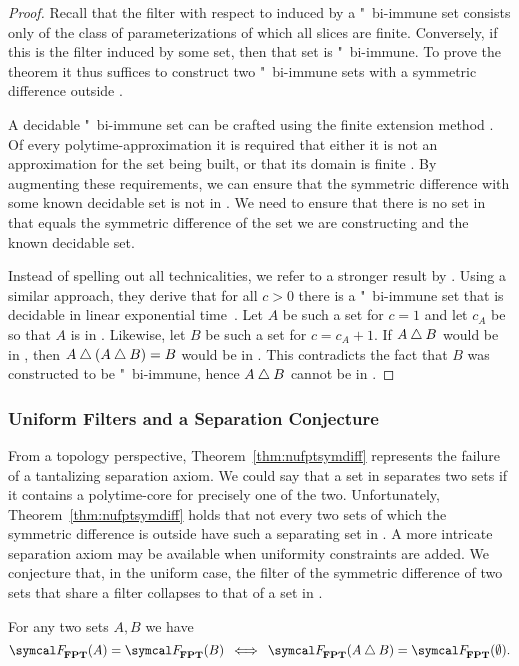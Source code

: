 \begin{proof}
  Recall that the filter with respect to  induced by a "~bi-immune set consists only of the class of parameterizations of which all slices are finite.
  Conversely, if this is the filter induced by some set, then that set is "~bi-immune.
  To prove the theorem it thus suffices to construct two "~bi-immune sets with a symmetric difference outside .

  A decidable "~bi-immune set can be crafted using the finite extension method \parencite{downey2010algorithmic}.
  Of every polytime-approximation it is required that either it is not an approximation for the set being built, or that its domain is finite \parencite{balcazar1990structural}.
  By augmenting these requirements, we can ensure that the symmetric difference with some known decidable set is not in .
  We need to ensure that there is no set in  that equals the symmetric difference of the set we are constructing and the known decidable set.

  Instead of spelling out all technicalities, we refer to a stronger result by \textcite{geske1991note}.
  Using a similar approach, they derive that for all $c > 0$ there is a "~bi-immune set that is decidable in linear exponential time~\parencite{mayordomo1994almost}.
  Let $A$ be such a set for $c = 1$ and let $c_A$ be so that $A$ is in .
  Likewise, let $B$ be such a set for $c = c_A + 1$.
  If $A \bigtriangleup B$ would be in , then $A \bigtriangleup (A \bigtriangleup B) = B$ would be in .
  This contradicts the fact that $B$ was constructed to be "~bi-immune, hence $A \bigtriangleup B$ cannot be in .
\end{proof}

\subsubsection{Uniform Filters and a Separation Conjecture}
From a topology perspective, Theorem~\ref{thm:nufptsymdiff} represents the failure of a tantalizing separation axiom.
We could say that a set in  separates two sets if it contains a polytime-core for precisely one of the two.
Unfortunately, Theorem~\ref{thm:nufptsymdiff} holds that not every two sets of which the symmetric difference is outside  have such a separating set in .
A more intricate separation axiom may be available when uniformity constraints are added.
We conjecture that, in the uniform case, the filter of the symmetric difference of two sets that share a filter collapses to that of a set in .
\begin{conjecture}
\label{con:fptsymdiff}%
  For any two sets $A, B$ we have
  \begin{equation*}
    \calF_\cl{FPT}(A) = \calF_\cl{FPT}(B) \:\iff\: \calF_\cl{FPT}(A \symdiff B) = \calF_\cl{FPT}(\emptyset).
  \end{equation*}
\end{conjecture}


